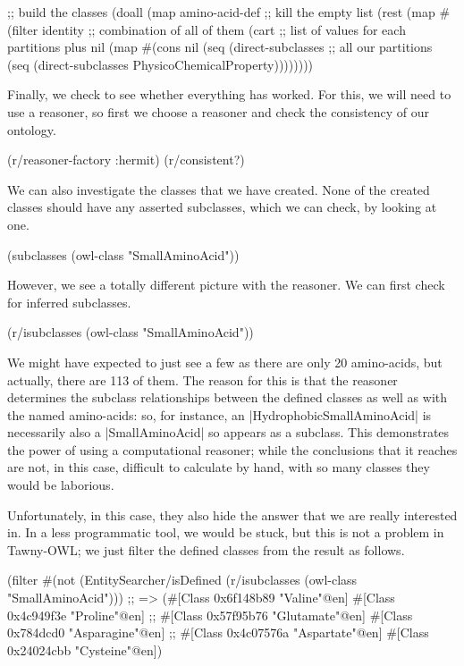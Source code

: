 \begin{tawny}
;; build the classes
(doall
 (map
  amino-acid-def
  ;; kill the empty list
  (rest
   (map
    #(filter identity %
    ;; combination of all of them
    (cart
     ;; list of values for each partitions plus nil
     (map
      #(cons nil (seq (direct-subclasses %
      ;; all our partitions
      (seq (direct-subclasses PhysicoChemicalProperty))))))))
\end{tawny}

Finally, we check to see whether everything has worked. For this, we will need
to use a reasoner, so first we choose a reasoner and check the consistency of
our ontology.

\begin{tawny}
(r/reasoner-factory :hermit)
(r/consistent?)
\end{tawny}

We can also investigate the classes that we have created. None of the created classes
should have any asserted subclasses, which we can check, by looking at one.

\begin{tawny}
(subclasses
 (owl-class "SmallAminoAcid"))
\end{tawny}

However, we see a totally different picture with the reasoner. We can first
check for inferred subclasses.

\begin{tawny}
(r/isubclasses
 (owl-class "SmallAminoAcid"))
\end{tawny}

We might have expected to just see a few as there are only 20 amino-acids, but
actually, there are 113 of them. The reason for this is that the reasoner
determines the subclass relationships between the defined classes as well as
with the named amino-acids: so, for instance, an |HydrophobicSmallAminoAcid|
is necessarily also a |SmallAminoAcid| so appears as a subclass. This
demonstrates the power of using a computational reasoner; while the
conclusions that it reaches are not, in this case, difficult to calculate by
hand, with so many classes they would be laborious.

Unfortunately, in this case, they also hide the answer that we are really
interested in. In a less programmatic tool, we would be stuck, but this is not
a problem in Tawny-OWL; we just filter the defined classes from the result as
follows.

\begin{tawny}
(filter
 #(not (EntitySearcher/isDefined %
 (r/isubclasses
  (owl-class "SmallAminoAcid")))
;; => (#[Class 0x6f148b89 "Valine"@en] #[Class 0x4c949f3e "Proline"@en]
;;     #[Class 0x57f95b76 "Glutamate"@en] #[Class 0x784dcd0 "Asparagine"@en]
;;     #[Class 0x4c07576a "Aspartate"@en] #[Class 0x24024cbb "Cysteine"@en])
\end{tawny}

